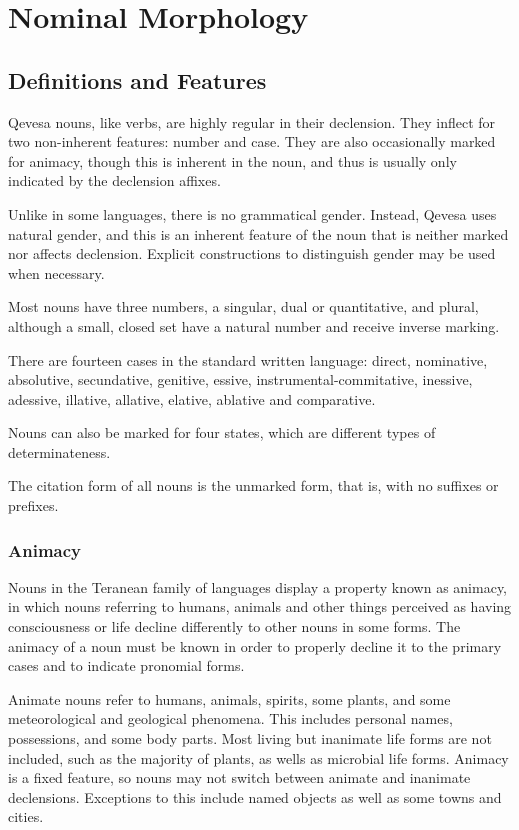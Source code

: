 \documentclass[grammar]{subfiles}
\begin{document}
\chapter{Nominal Morphology}
\label{ch:nominal_morphology}


\section{Definitions and Features}
\label{sec:nm_definition_features}

Qevesa nouns, like verbs, are highly regular in their declension.  They
inflect for two non-inherent features: number and case.  They are also
occasionally marked for animacy, though this is inherent in the noun, and
thus is usually only indicated by the declension affixes. 

Unlike in some languages, there is no grammatical gender.  Instead, Qevesa
uses natural gender, and this is an inherent feature of the noun that is
neither marked nor affects declension.  Explicit constructions to distinguish
gender may be used when necessary.

Most nouns have three numbers, a singular, dual or quantitative, and plural,
although a small, closed set have a natural number and receive inverse
marking. 

There are fourteen cases in the standard written language: direct, nominative,
absolutive, secundative, genitive, essive, instrumental-commitative,
inessive, adessive, illative, allative, elative, ablative and comparative.

Nouns can also be marked for four states, which are different types of determinateness.

The citation form of all nouns is the unmarked form, that is, with no suffixes or prefixes.


\subsection{Animacy}
\label{ssec:nm_animacy}

Nouns in the Teranean family of languages display a property known as animacy,
in which nouns referring to humans, animals and other things perceived as
having consciousness or life decline differently to other nouns in some
forms.  The animacy of a noun must be known in order to properly decline it
to the primary cases and to indicate pronomial forms.

Animate nouns refer to humans, animals, spirits, some plants, and some
meteorological and geological phenomena.  This includes personal names,
possessions, and some body parts.  Most living but inanimate life forms are
not included, such as the majority of plants, as wells as microbial life
forms.  Animacy is a fixed feature, so nouns may not switch between animate
and inanimate declensions.  Exceptions to this include named objects as well
as some towns and cities.
\end{document}
